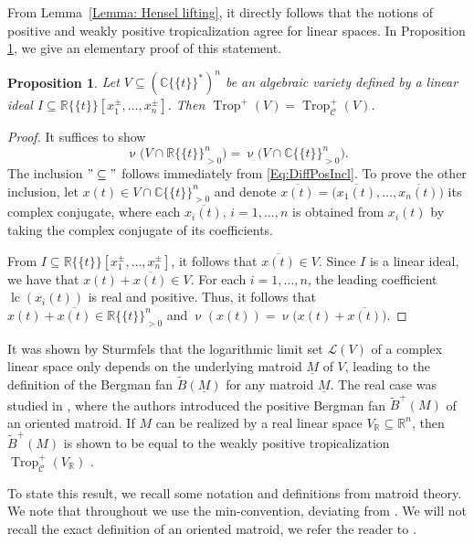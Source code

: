 \documentclass{article}
\newtheorem{proposition}[theorem]{Proposition}
\theoremstyle{definition}
\DeclareMathOperator{\val}{\nu}
\DeclareMathOperator{\lc}{lc}
\DeclareMathOperator{\Trop}{Trop}
\newcommand{\R}{\mathbb{R}}
\newcommand{\CC}{\mathcal{C}}
\newcommand{\LL}{\mathcal{L}}
\begin{document}
From Lemma~\ref{Lemma: Hensel lifting}, it directly follows that the notions of positive and weakly positive tropicalization agree for linear spaces. In Proposition \ref{Prop:PositiveVSWeakPositiveTrop}, we give an elementary proof of this statement. 

\begin{proposition}
\label{Prop:PositiveVSWeakPositiveTrop}
Let $V \subseteq (\mathbb{C}\{\!\{t \}\!\}^*)^n$ be an algebraic variety defined by a linear ideal $I \subseteq \mathbb{R}\{\!\{t \}\!\}[x_1^\pm, \dots , x_n^\pm]$. Then $\Trop^+(V) =\Trop^+_\CC(V)$.
\end{proposition}

\begin{proof}
It suffices to show 
\[ \val \big( V \cap \mathbb{R}\{\!\{t \}\!\}^n_{>0} \big)  =  \val \big( V \cap \mathbb{C}\{\!\{t \}\!\}^n_{>0}\big).\]
 The inclusion $"\subseteq"$ follows immediately from \eqref{Eq:DiffPosIncl}. To prove the other inclusion, let $x(t) \in  V \cap \mathbb{C}\{\!\{t \}\!\}^n_{>0}$ and denote $\overline{ x(t)} = \big( \overline{x_1(t)} , \dots ,\overline{x_n(t)} \big)$ its complex conjugate, where each $\overline{x_i(t)}, \, i = 1 , \dots , n$ is obtained from $x_i(t)$ by taking the complex conjugate of its coefficients.
 
From $I \subseteq \mathbb{R}\{\!\{t \}\!\}[x_1^\pm, \dots , x_n^\pm]$, it follows that $\overline{ x(t)} \in V$. Since  $I$ is a linear ideal, we have that $x(t) + \overline{ x(t)} \in V $. For each $i = 1, \dots , n$, the leading coefficient $\lc(x_i(t))$ is real and positive. Thus, it follows that $x(t) + \overline{ x(t)} \in  \mathbb{R}\{\!\{t \}\!\}_{>0}^n$ and $\val(x(t)) = \val\big( x(t) + \overline{ x(t)} \big)$.
\end{proof}


It was shown by Sturmfels \cite{BerndSolving} that the logarithmic limit set $\LL(V)$ of a complex linear space only depends on the underlying matroid $\underline{M}$ of $V$, leading to the definition of the Bergman fan $\widetilde{B}(\underline{M})$ for any matroid $\underline{M}$.
The real case was studied in \cite{ARDILA2006577}, where the authors introduced the positive Bergman fan $\widetilde{B}^+(M)$ of an oriented matroid. If $M$ can be realized by a real linear space $V_\R\subseteq \R^n$, then
$\widetilde{B}^+(M)$ is shown to be equal to the weakly positive tropicalization $\Trop^+_\mathcal{C}(V_\R)$ \cite[Proposition 4.1]{ARDILA2006577}.

To state this result, we recall some notation and definitions from matroid theory.  We note that throughout we use the min-convention, deviating from \cite{ARDILA2006577}.
We will not recall the exact definition of an oriented matroid, we refer the reader to \cite[Chapter 6.3] {ziegler2012lectures}.
\end{document}
